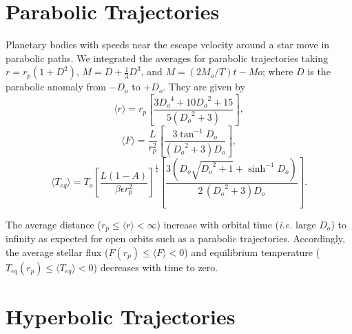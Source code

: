 \documentclass[a4paper,fleqn,usenatbib]{mnras}
\begin{document}
\section{Parabolic Trajectories}
\label{sec:parabolic}
Planetary bodies with speeds near the escape velocity around a star move in parabolic paths. We integrated the averages for parabolic trajectories taking $r=r_p(1+D^2)$, $M=D+\frac{1}{3}D^3$, and $M=(2M_o/T)t-Mo$; where $D$ is the parabolic anomaly from $-D_o$ to $+D_o$. They are given by
\begin{equation} \label{eq:rp}
\langle r \rangle = r_p \left[ \frac{3 {D_o}^{4} + 10 {D_o}^{2} + 15}{5 \left({D_o}^{2} + 3\right)} \right],
\end{equation}
\begin{equation} \label{eq:Fp}
\langle F \rangle = \frac{L}{r_p^2} \left[ \frac{3 \tan^{-1} D_o}{{\left({D_o}^2 + 3\right)} D_o} \right],
\end{equation}
\begin{equation} \label{eq:Tp}
\langle T_{eq} \rangle = T_o \left[\frac{L {\left(1 - A\right)}}{\beta \epsilon r_p^{2}}\right]^{\frac{1}{4}} \left[ \frac{3 {\left(D_o\sqrt{{D_o}^{2} + 1} + \sinh^{-1} D_o \right)}}{2 \, {\left({D_o}^{2} + 3\right)} D_o} \right].
\end{equation}

The average distance ($r_p \leq \langle r \rangle < \infty$) increase with orbital time (\emph{i.e.} large $D_o$) to infinity as expected for open orbits such as a parabolic trajectories. Accordingly, the average stellar flux ($F(r_p) \leq \langle F \rangle < 0$) and equilibrium temperature ($T_{eq}(r_p) \leq \langle T_{eq} \rangle < 0$) decreases with time to zero.


\section{Hyperbolic Trajectories}
\label{sec:hyperbolic}
\end{document}
